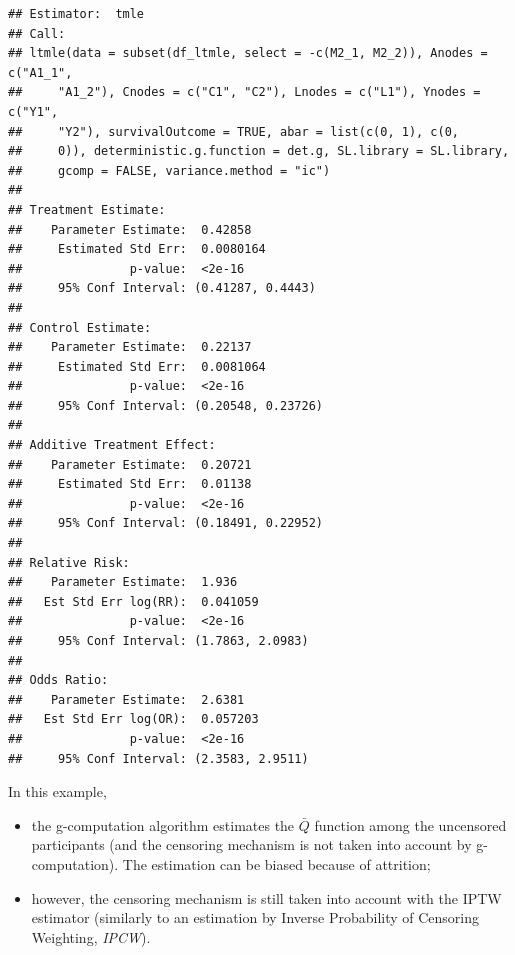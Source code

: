 \documentclass[
]{book}
\providecommand{\tightlist}{%
  \setlength{\itemsep}{0pt}\setlength{\parskip}{0pt}}
\begin{document}
\begin{verbatim}
## Estimator:  tmle 
## Call:
## ltmle(data = subset(df_ltmle, select = -c(M2_1, M2_2)), Anodes = c("A1_1", 
##     "A1_2"), Cnodes = c("C1", "C2"), Lnodes = c("L1"), Ynodes = c("Y1", 
##     "Y2"), survivalOutcome = TRUE, abar = list(c(0, 1), c(0, 
##     0)), deterministic.g.function = det.g, SL.library = SL.library, 
##     gcomp = FALSE, variance.method = "ic")
## 
## Treatment Estimate:
##    Parameter Estimate:  0.42858 
##     Estimated Std Err:  0.0080164 
##               p-value:  <2e-16 
##     95% Conf Interval: (0.41287, 0.4443) 
## 
## Control Estimate:
##    Parameter Estimate:  0.22137 
##     Estimated Std Err:  0.0081064 
##               p-value:  <2e-16 
##     95% Conf Interval: (0.20548, 0.23726) 
## 
## Additive Treatment Effect:
##    Parameter Estimate:  0.20721 
##     Estimated Std Err:  0.01138 
##               p-value:  <2e-16 
##     95% Conf Interval: (0.18491, 0.22952) 
## 
## Relative Risk:
##    Parameter Estimate:  1.936 
##   Est Std Err log(RR):  0.041059 
##               p-value:  <2e-16 
##     95% Conf Interval: (1.7863, 2.0983) 
## 
## Odds Ratio:
##    Parameter Estimate:  2.6381 
##   Est Std Err log(OR):  0.057203 
##               p-value:  <2e-16 
##     95% Conf Interval: (2.3583, 2.9511)
\end{verbatim}

In this example,

\begin{itemize}
\tightlist
\item
  the g-computation algorithm estimates the \(\bar{Q}\) function among the uncensored participants (and the censoring mechanism is not taken into account by g-computation). The estimation can be biased because of attrition;
\item
  however, the censoring mechanism is still taken into account with the IPTW estimator (similarly to an estimation by Inverse Probability of Censoring Weighting, \emph{IPCW}).
\end{itemize}
\end{document}
